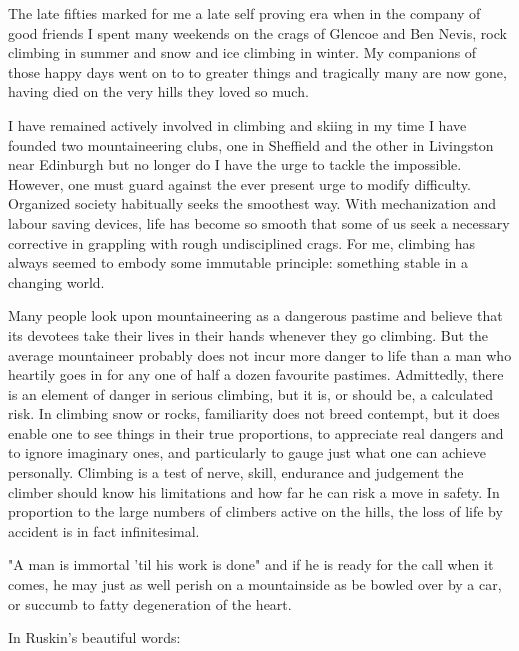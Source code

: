 \documentclass[a5paper,openany,font 10pt]{scrbook}
\begin{document}
The late fifties marked for me a late self proving era when
in the company of good friends I spent many weekends on the crags
of Glencoe and Ben Nevis, rock climbing in summer and snow and
ice climbing in winter. My companions of those happy days went on
to to greater things and tragically many are now gone, having
died on the very hills they loved so much.

I have remained actively involved in climbing and skiing
in my time I have founded two mountaineering clubs, one in
Sheffield and the other in Livingston near Edinburgh   but no
longer do I have the urge to tackle the impossible. However, one
must guard against the ever present urge to modify difficulty.
Organized society habitually seeks the smoothest way. With
mechanization and labour saving devices, life has become so
smooth that some of us seek a necessary corrective in grappling
with rough undisciplined crags. For me, climbing has always
seemed to embody some immutable principle: something stable in a
changing world.

Many people look upon mountaineering as a dangerous pastime
and believe that its devotees take their lives in their hands
whenever they go climbing. But the average mountaineer probably
does not incur more danger to life than a man who heartily goes
in for any one of half a dozen favourite pastimes. Admittedly,
there is an element of danger in serious climbing, but it is, or
should be, a calculated risk. In climbing snow or rocks,
familiarity does not breed contempt, but it does enable one to
see things in their true proportions, to appreciate real dangers
and to ignore imaginary ones, and particularly to gauge just what
one can achieve personally. Climbing is a test of nerve, skill,
endurance and judgement  the climber should know his limitations
and how far he can risk a move in safety. In proportion to the
large numbers of climbers active on the hills, the loss of life
by accident is in fact infinitesimal.

"A man is immortal 'til his work is done" and if he is ready
for the call when it comes, he may just as well perish on a
mountainside as be bowled over by a car, or succumb to fatty
degeneration of the heart.

In Ruskin's beautiful words:
\end{document}
